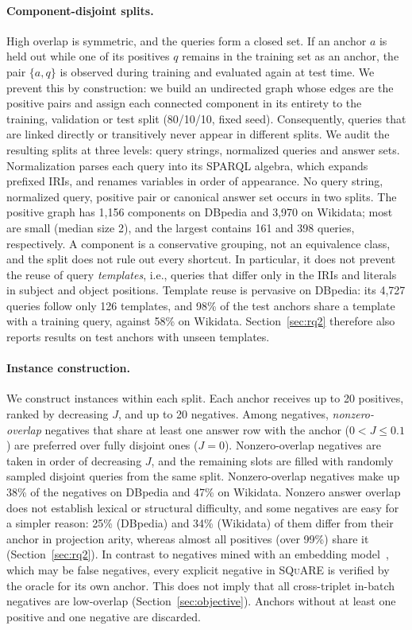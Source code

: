 \documentclass[runningheads]{llncs}
\newcommand{\squareds}{\textsc{SQuARE}}
\begin{document}
\paragraph{Component-disjoint splits.}
High overlap is symmetric, and the queries form a closed set. If an
anchor $a$ is held out while one of its positives $q$ remains in the training
set as an anchor, the pair $\{a,q\}$ is observed during training and evaluated
again at test time. We prevent this by construction: we build an undirected
graph whose edges are the positive pairs and assign each connected component
in its entirety to the training, validation or test split (80/10/10, fixed
seed). Consequently, queries that are linked directly or transitively never
appear in different splits. We audit the resulting splits at three levels: query strings, normalized
queries and answer sets. Normalization parses each query into its SPARQL
algebra, which expands prefixed IRIs, and renames variables in order of
appearance. No query string, normalized query, positive pair or canonical
answer set occurs in two splits. The positive graph has 1{,}156 components on
DBpedia and 3{,}970 on Wikidata; most are small (median size 2), and the
largest contains 161 and 398 queries, respectively.
A component is a conservative grouping, not an equivalence class, and the
split does not rule out every shortcut. In particular, it does not prevent
the reuse of query \emph{templates}, i.e., queries that differ only in the
IRIs and literals in subject and object positions. Template reuse is
pervasive on DBpedia: its 4{,}727 queries follow only 126 templates, and 98\%
of the test anchors share a template with a training query, against 58\% on
Wikidata. Section~\ref{sec:rq2} therefore also reports results on test
anchors with unseen templates.

\paragraph{Instance construction.}
We construct instances within each split. Each anchor receives up to 20
positives, ranked by decreasing $J$, and up to 20 negatives. Among negatives,
\emph{nonzero-overlap} negatives that share at least one answer row with the
anchor ($0 < J \leq 0.1$) are preferred over fully disjoint ones ($J = 0$).
Nonzero-overlap negatives are taken in order of decreasing $J$, and the
remaining slots are filled with randomly sampled disjoint queries from the
same split. Nonzero-overlap negatives make up 38\% of the negatives on DBpedia
and 47\% on Wikidata. Nonzero answer overlap does not establish lexical or
structural difficulty, and some negatives are easy for a simpler reason: 25\%
(DBpedia) and 34\% (Wikidata) of them differ from their anchor in projection
arity, whereas almost all positives (over 99\%) share it
(Section~\ref{sec:rq2}). In contrast to negatives mined
with an embedding model~\cite{xiong2021ance}, which may be false negatives,
every explicit negative in \squareds{} is verified by the oracle for its
own anchor. This does not imply that all cross-triplet in-batch negatives are
low-overlap (Section~\ref{sec:objective}). Anchors without at
least one positive and one negative are discarded.
\end{document}

